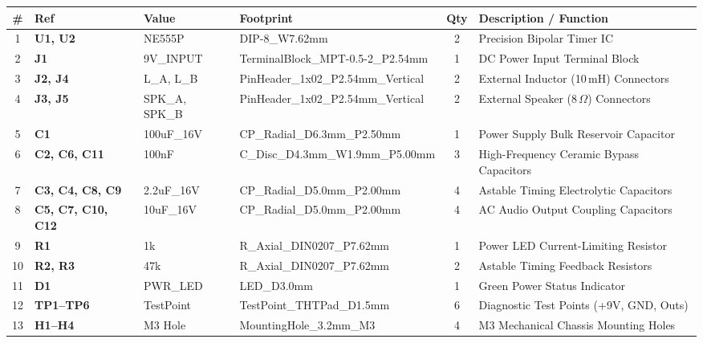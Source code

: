 \documentclass[11pt,a4paper]{article}
\begin{document}
\begin{table}[H]
\centering
\small
\renewcommand{\arraystretch}{1.2}
\begin{tabularx}{\textwidth}{|c|>{\bfseries}p{2.2cm}|p{2.0cm}|p{4.2cm}|c|X|}
\hline
\textbf{\#} & \textbf{Ref} & \textbf{Value} & \textbf{Footprint} & \textbf{Qty} & \textbf{Description / Function} \\ \hline
1 & U1, U2 & NE555P & DIP-8\_W7.62mm & 2 & Precision Bipolar Timer IC \\ \hline
2 & J1 & 9V\_INPUT & TerminalBlock\_MPT-0.5-2\_P2.54mm & 1 & DC Power Input Terminal Block \\ \hline
3 & J2, J4 & L\_A, L\_B & PinHeader\_1x02\_P2.54mm\_Vertical & 2 & External Inductor (10\,mH) Connectors \\ \hline
4 & J3, J5 & SPK\_A, SPK\_B & PinHeader\_1x02\_P2.54mm\_Vertical & 2 & External Speaker ($8\,\Omega$) Connectors \\ \hline
5 & C1 & 100uF\_16V & CP\_Radial\_D6.3mm\_P2.50mm & 1 & Power Supply Bulk Reservoir Capacitor \\ \hline
6 & C2, C6, C11 & 100nF & C\_Disc\_D4.3mm\_W1.9mm\_P5.00mm & 3 & High-Frequency Ceramic Bypass Capacitors \\ \hline
7 & C3, C4, C8, C9 & 2.2uF\_16V & CP\_Radial\_D5.0mm\_P2.00mm & 4 & Astable Timing Electrolytic Capacitors \\ \hline
8 & C5, C7, C10, C12 & 10uF\_16V & CP\_Radial\_D5.0mm\_P2.00mm & 4 & AC Audio Output Coupling Capacitors \\ \hline
9 & R1 & 1k & R\_Axial\_DIN0207\_P7.62mm & 1 & Power LED Current-Limiting Resistor \\ \hline
10 & R2, R3 & 47k & R\_Axial\_DIN0207\_P7.62mm & 2 & Astable Timing Feedback Resistors \\ \hline
11 & D1 & PWR\_LED & LED\_D3.0mm & 1 & Green Power Status Indicator \\ \hline
12 & TP1--TP6 & TestPoint & TestPoint\_THTPad\_D1.5mm & 6 & Diagnostic Test Points (+9V, GND, Outs) \\ \hline
13 & H1--H4 & M3 Hole & MountingHole\_3.2mm\_M3 & 4 & M3 Mechanical Chassis Mounting Holes \\ \hline
\end{tabularx}
\end{table}
\end{document}
